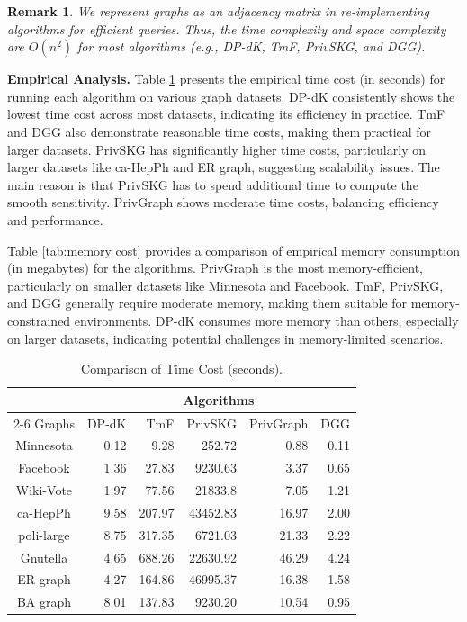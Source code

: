 \documentclass[conference]{IEEEtran}
\theoremstyle{plain}
\newtheorem{remark}{Remark}
\begin{document}
\begin{remark}
   We represent graphs as an adjacency matrix in re-implementing algorithms for efficient queries.
   Thus, the time complexity and space complexity are $O(n^2)$ for most algorithms (e.g., DP-dK, TmF, PrivSKG, and DGG).
\end{remark}

\noindent\textbf{Empirical Analysis.}
Table \ref{tab:time cost} presents the empirical time cost (in seconds) for running each algorithm on various graph datasets.
DP-dK consistently shows the lowest time cost across most datasets, indicating its efficiency in practice.
TmF and DGG also demonstrate reasonable time costs, making them practical for larger datasets.
PrivSKG has significantly higher time costs, particularly on larger datasets like ca-HepPh and ER graph, suggesting scalability issues.
The main reason is that PrivSKG has to spend additional time to compute the smooth sensitivity.
PrivGraph shows moderate time costs, balancing efficiency and performance.

Table \ref{tab:memory cost} provides a comparison of empirical memory consumption (in megabytes) for the algorithms.
PrivGraph is the most memory-efficient, particularly on smaller datasets like Minnesota and Facebook.
TmF, PrivSKG, and DGG generally require moderate memory, making them suitable for memory-constrained environments.
DP-dK consumes more memory than others, especially on larger datasets, indicating potential challenges in memory-limited scenarios.

\begin{table}[t]
\small
   \caption{Comparison of Time Cost (seconds).}
	\label{tab:time cost}
	\centering
		\begin{tabular}{|c|r|r|r|r|r|}
			\hline
           &  \multicolumn{5}{c|}{Algorithms} \\ \cline{2-6}
    Graphs & DP-dK  & TmF & PrivSKG  & PrivGraph & DGG\\ \hline    
    Minnesota &  0.12 & 9.28   & 252.72 & 0.88 & 0.11\\
    Facebook  & 1.36  & 27.83  & 9230.63 & 3.37 & 0.65 \\
    Wiki-Vote & 1.97  & 77.56  & 21833.8 & 7.05 & 1.21 \\
    ca-HepPh  & 9.58  & 207.97 & 43452.83 & 16.97 & 2.00 \\
    poli-large & 8.75 & 317.35 & 6721.03 & 21.33 & 2.22 \\
    Gnutella  & 4.65  & 688.26 & 22630.92 & 46.29 & 4.24 \\
    ER graph  & 4.27  & 164.86 & 46995.37& 16.38 & 1.58 \\
    BA graph  & 8.01  & 137.83 & 9230.20 & 10.54 & 0.95 \\
     \hline     
   \end{tabular}
\end{table}
\end{document}
